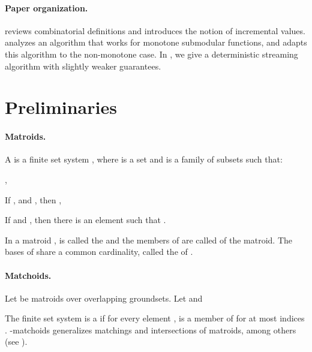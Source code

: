 \documentclass[oneside,letterpaper]{scrartcl} \usepackage{macros}
\begin{document}
\paragraph{Paper organization.}  reviews
combinatorial definitions and introduces the notion of incremental
values.  analyzes an algorithm that works
for monotone submodular functions, and
 adapts this algorithm to the
non-monotone case. In , we give
a deterministic streaming algorithm with slightly weaker guarantees.

\section{Preliminaries}










\paragraph{Matroids.}
A  is a finite set system , where  is a set and
 is a family of subsets
such that:\begin{inline_properties}
\item ,
\item If , and , then ,
\item If  and , then there is an
  element  such that .
\end{inline_properties}
In a matroid ,  is
called the  and the members of  are
called  of the matroid. The bases of
 share a common cardinality, called the  of
.







\paragraph{Matchoids.}
Let  be  matroids over
overlapping groundsets. Let  and

The finite set system  is a  if
for every element ,  is a member of
 for at most  indices .
-matchoids generalizes matchings and intersections of matroids,
among others (see ).
\end{document}
